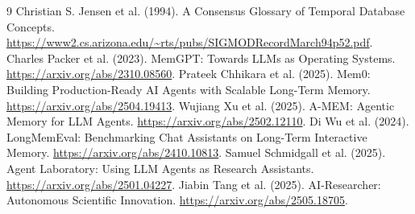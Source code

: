 \documentclass{article}
\begin{document}
\begin{thebibliography}{9}
 Christian S. Jensen et al. (1994). A Consensus Glossary of Temporal Database Concepts. \url{https://www2.cs.arizona.edu/~rts/pubs/SIGMODRecordMarch94p52.pdf}.
 Charles Packer et al. (2023). MemGPT: Towards LLMs as Operating Systems. \url{https://arxiv.org/abs/2310.08560}.
 Prateek Chhikara et al. (2025). Mem0: Building Production-Ready AI Agents with Scalable Long-Term Memory. \url{https://arxiv.org/abs/2504.19413}.
 Wujiang Xu et al. (2025). A-MEM: Agentic Memory for LLM Agents. \url{https://arxiv.org/abs/2502.12110}.
 Di Wu et al. (2024). LongMemEval: Benchmarking Chat Assistants on Long-Term Interactive Memory. \url{https://arxiv.org/abs/2410.10813}.
 Samuel Schmidgall et al. (2025). Agent Laboratory: Using LLM Agents as Research Assistants. \url{https://arxiv.org/abs/2501.04227}.
 Jiabin Tang et al. (2025). AI-Researcher: Autonomous Scientific Innovation. \url{https://arxiv.org/abs/2505.18705}.
\end{thebibliography}
\end{document}
